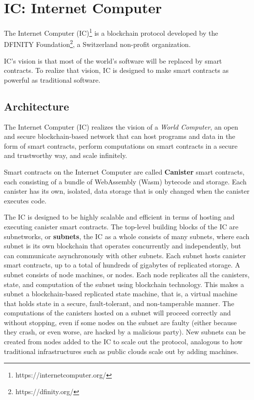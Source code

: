 \section{IC: Internet Computer}
\label{sec:icp}

The Internet Computer (IC)\footnote{https://internetcomputer.org/} is a blockchain protocol developed by the DFINITY Foundation\footnote{https://dfinity.org/}, a Switzerland non-profit organization.  

IC's vision is that most of the world's software will be replaced by smart contracts. To realize that vision, IC is designed to make smart contracts as powerful as traditional software. \cite{icp-vision}

\subsection{Architecture}

The Internet Computer (IC) realizes the vision of a \textit{World Computer}, an open and secure blockchain-based network that can host programs and data in the form of smart contracts, perform computations on smart contracts in a secure and trustworthy way, and scale infinitely.\cite{icp-how-it-works}

Smart contracts on the Internet Computer are called \textbf{Canister} smart contracts, each consisting of a bundle of WebAssembly (Wasm) bytecode and storage. Each canister has its own, isolated, data storage that is only changed when the canister executes code. \cite{icp-how-it-works}

The IC is designed to be highly scalable and efficient in terms of hosting and executing canister smart contracts. The top-level building blocks of the IC are subnetworks, or \textbf{subnets}, the IC as a whole consists of many subnets, where each subnet is its own blockchain that operates concurrently and independently, but can communicate asynchronously with other subnets. Each subnet hosts canister smart contracts, up to a total of hundreds of gigabytes of replicated storage. A subnet consists of node machines, or nodes. Each node replicates all the canisters, state, and computation of the subnet using blockchain technology. This makes a subnet a blockchain-based replicated state machine, that is, a virtual machine that holds state in a secure, fault-tolerant, and non-tamperable manner. The computations of the canisters hosted on a subnet will proceed correctly and without stopping, even if some nodes on the subnet are faulty (either because they crash, or even worse, are hacked by a malicious party). New subnets can be created from nodes added to the IC to scale out the protocol, analogous to how traditional infrastructures such as public clouds scale out by adding machines. \cite{icp-architecture}

